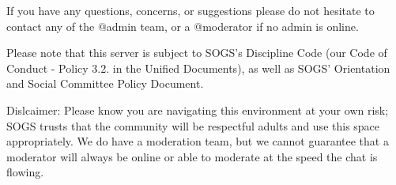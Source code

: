 \begin{longenum}[ label*=\thesubsection.\arabic*., align=left]
\begin{longenum}[label*=\arabic*., align=left]
			\item If you have any questions, concerns, or suggestions please do not hesitate to contact any of the @admin team, or a @moderator if no admin is online.
			\item Please note that this server is subject to SOGS's Discipline Code (our Code of Conduct - Policy 3.2. in the Unified Documents), as well as SOGS' Orientation and Social Committee Policy Document.			
			\item Dislcaimer: Please know you are navigating this environment at your own risk; SOGS trusts that the community will be respectful adults and use this space appropriately. We do have a moderation team, but we cannot guarantee that a moderator will always be online or able to moderate at the speed the chat is flowing.
		\end{longenum}								
\end{longenum}















